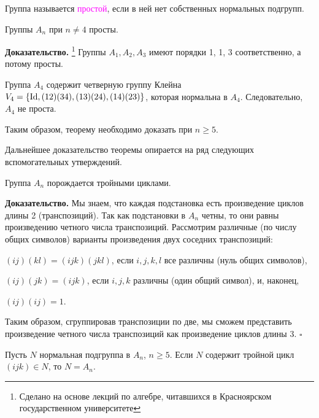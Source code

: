 
Группа называется \textcolor{magenta}{простой}, если в ней нет собственных нормальных подгрупп.


\begin{theorem}\label{Tm_An_simple}
Группы \(A_{n}\) при \(n \neq 4\) просты.
\end{theorem}
\textbf{Доказательство.}
\footnote{Сделано на основе лекций по алгебре, читавшихся в Красноярском государственном университете}
Группы $A_1, A_2, A_3$ имеют порядки 1, 1, 3 соответственно, а потому просты. 
\medskip


Группа \(A_{4}\) содержит четверную группу Клейна \(V_{4}=\{\mathrm{Id} , (12)(34), (13)(24), (14)(23) \}\), которая нормальна в $A_4$. Следовательно, $A_4$ не проста.
\medskip

Таким образом, теорему необходимо доказать при $n\geqslant5$.
\medskip

Дальнейшее доказательство теоремы опирается на ряд следующих вспомогательных утверждений.

\begin{theorem}\label{Tm_An_Generation}
Группа \(A_n\) порождается тройными циклами.
\end{theorem}

\textbf{Доказательство.}
%
Мы знаем, что каждая подстановка есть произведение циклов длины 2
(транспозиций). Так как подстановки в \(A_{n}\) четны, то они равны
произведению четного числа транспозиций. Рассмотрим различные (по числу общих символов) варианты произведения двух
соседних транспозиций:

\( (ij)(kl) = (ijk)(jkl)\),
если \(i,j,k,l\) все различны (нуль общих символов),

\(\left( ij \right)\left( jk \right) = \left( {{ijk}} \right)\),
если \(i,j,k\) различны (один общий символ), и, наконец,

\(\left( {{ij}} \right)\left( {{ij}} \right) = 1\).
\medskip

Таким образом, сгруппировав транспозиции по две, мы сможем представить произведение четного числа транспозиций как произведение циклов
длины 3. $\square$

\begin{lemma}\label{Lm_If_triple}
Пусть $N$ нормальная подгруппа в \(A_{n}\), $n\geqslant 5$. Если \(N\) содержит тройной цикл \( (ijk) \in N\), то \(N = A_{n}\).
\end{lemma}

